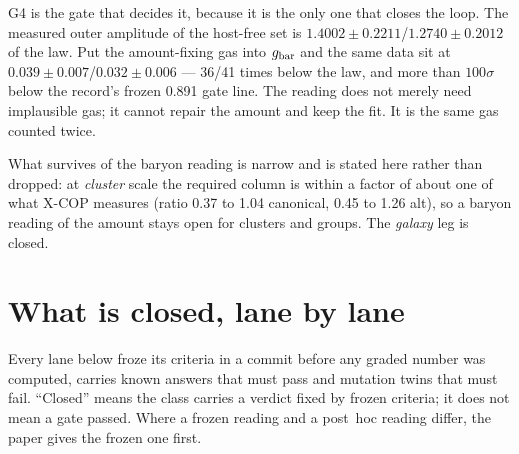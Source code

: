 \documentclass[10pt]{article}
\begin{document}
G4 is the gate that decides it, because it is the only one that closes the loop. The measured outer amplitude of the
host-free set is $1.4002\pm0.2211$/$1.2740\pm0.2012$ of the law. Put the amount-fixing gas into $g_{\rm bar}$ and the same
data sit at $0.039\pm0.007$/$0.032\pm0.006$ --- 36/41 times below the law, and more than $100\sigma$ below the
record's frozen 0.891 gate line. The reading does not merely need implausible gas; it cannot repair the amount and keep
the fit. It is the same gas counted twice.

What survives of the baryon reading is narrow and is stated here rather than dropped: at {\it cluster} scale the required
column is within a factor of about one of what X-COP measures (ratio 0.37 to 1.04 canonical, 0.45 to 1.26 alt), so a
baryon reading of the amount stays open for clusters and groups. The {\it galaxy} leg is closed.

\section{What is closed, lane by lane}
Every lane below froze its criteria in a commit before any graded number was computed, carries known answers that must
pass and mutation twins that must fail. ``Closed'' means the class carries a verdict fixed by frozen criteria; it does not
mean a gate passed. Where a frozen reading and a post~hoc reading differ, the paper gives the frozen one first.
\end{document}
